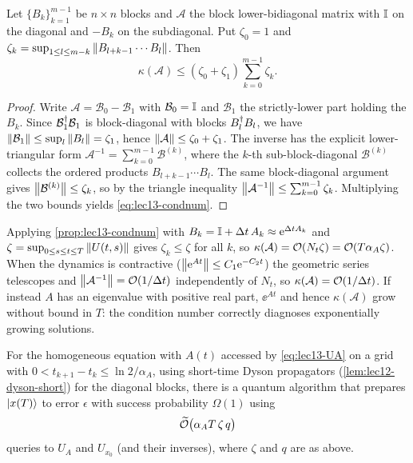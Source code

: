 \begin{proposition}
\label{prop:lec13-condnum}
Let $\{B_k\}_{k=1}^{m-1}$ be $n\times n$ blocks and $\mathcal A$ the block lower-bidiagonal
matrix with $\mathbb{I}$ on the diagonal and $-B_k$ on the subdiagonal. Put $\zeta_0=1$ and
$\zeta_k=\sup_{1\le l\le m-k}\left\lVert B_{l+k-1}\cdots B_l \right\rVert$. Then
\begin{equation}
  \kappa(\mathcal A)\le(\zeta_0+\zeta_1)\sum_{k=0}^{m-1}\zeta_k.
  \label{eq:lec13-condnum}
\end{equation}
\end{proposition}

\begin{proof}
Write $\mathcal A=\mathcal B_0-\mathcal B_1$ with $\mathcal B_0=\mathbb{I}$ and $\mathcal B_1$ the
strictly-lower part holding the $B_k$. Since $\mathcal B_1^{\dagger}\mathcal B_1$ is block-diagonal
with blocks $B_l^{\dagger} B_l$, we have $\left\lVert \mathcal B_1 \right\rVert\le\sup_l\left\lVert B_l \right\rVert=\zeta_1$, hence
$\left\lVert \mathcal A \right\rVert\le\zeta_0+\zeta_1$. The inverse has the explicit lower-triangular form
$\mathcal A^{-1}=\sum_{k=0}^{m-1}\mathcal B^{(k)}$, where the $k$-th sub-block-diagonal
$\mathcal B^{(k)}$ collects the ordered products $B_{l+k-1}\cdots B_l$. The same
block-diagonal argument gives $\left\lVert \mathcal B^{(k)} \right\rVert\le\zeta_k$, so by the triangle
inequality $\left\lVert \mathcal A^{-1} \right\rVert\le\sum_{k=0}^{m-1}\zeta_k$. Multiplying the two bounds
yields \eqref{eq:lec13-condnum}.
\end{proof}

Applying \cref{prop:lec13-condnum} with $B_k=\mathbb{I}+\Delta t\,A_k\approx\mathrm{e}^{\Delta t A_k}$ and
$\zeta=\sup_{0\le s\le t\le T}\left\lVert U(t,s) \right\rVert$ gives $\zeta_k\le\zeta$ for all $k$, so
$\kappa(\mathcal A)=\mathcal{O}(N_t\zeta)=\mathcal{O}(T\alpha_A\zeta)$. When the dynamics is contractive
($\left\lVert \mathrm{e}^{At} \right\rVert\le C_1\mathrm{e}^{-C_2t}$) the geometric series telescopes and
$\left\lVert \mathcal A^{-1} \right\rVert=\mathcal{O}(1/\Delta t)$ independently of $N_t$, so $\kappa(\mathcal A)
=\mathcal{O}(1/\Delta t)$. If instead $A$ has an eigenvalue with positive real part, $\ee^{At}$ and
hence $\kappa(\mathcal A)$ grow without bound in $T$: the condition number correctly diagnoses
exponentially growing solutions.

\begin{theorem}
\label{thm:lec13-lse}
For the homogeneous equation with $A(t)$ accessed by \eqref{eq:lec13-UA} on a grid with
$0<t_{k+1}-t_k\le\ln2/\alpha_A$, using short-time Dyson propagators (\cref{lem:lec12-dyson-short})
for the diagonal blocks, there is a quantum algorithm that prepares $\ket{x(T)}$ to error
$\epsilon$ with success probability $\Omega(1)$ using
\begin{equation}
  \widetilde{\mathcal{O}}\bigl(\alpha_A T\,\zeta\,q\bigr)
  \label{eq:lec13-lse-cost}
\end{equation}
queries to $U_A$ and $U_{x_0}$ (and their inverses), where $\zeta$ and $q$ are as above.
\end{theorem}

